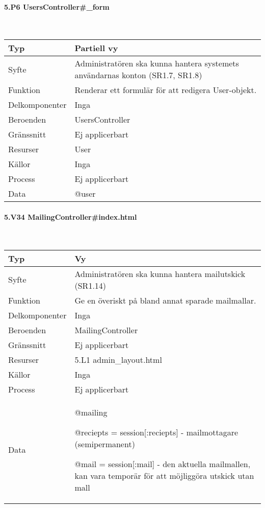 \documentclass[a4paper, twoside, 11pt, titlepage]{article}
\begin{document}
			\paragraph{5.P6 UsersController\#\_form}\

			\begin {table} [ht] \begin{tabular} {  p{3.5cm} p{9.6cm} }
				\hline
				{Typ} & {Partiell vy} \\
				\hline
				{Syfte} & {Administratören ska kunna hantera systemets användarnas konton (SR1.7, SR1.8)} \\
				\hline
				{Funktion} & {Renderar ett formulär för att redigera User-objekt.} \\
				\hline
				{Delkomponenter} & {Inga} \\
				\hline
				{Beroenden} & {UsersController} \\
				\hline
				{Gränssnitt} & {Ej applicerbart} \\
				\hline
				{Resurser} & {User} \\
				\hline
				{Källor} & {Inga} \\
				\hline
				{Process} & {Ej applicerbart} \\
				\hline
				{Data} & {@user} \\
				\hline
			\end{tabular} \end{table} \FloatBarrier


			\paragraph{5.V34 MailingController\#index.html}\

			\begin {table} [ht] \begin{tabular} {  p{3.5cm} p{9.6cm} }
				\hline
				{Typ} & {Vy} \\
				\hline
				{Syfte} & {Administratören ska kunna hantera mailutskick (SR1.14)} \\
				\hline
				{Funktion} & {Ge en överiskt på bland annat sparade mailmallar.} \\
				\hline
				{Delkomponenter} & {Inga} \\
				\hline
				{Beroenden} & {MailingController} \\
				\hline
				{Gränssnitt} & {Ej applicerbart} \\
				\hline
				{Resurser} & {5.L1 admin\_layout.html} \\
				\hline
				{Källor} & {Inga} \\
				\hline
				{Process} & {Ej applicerbart} \\
				\hline
				{Data} & {@mailing

@reciepts = session[:reciepts] - mailmottagare (semipermanent)

@mail = session[:mail] - den aktuella mailmallen, kan vara temporär för att möjliggöra utskick utan mall} \\
				\hline
			\end{tabular} \end{table} \FloatBarrier
\end{document}
